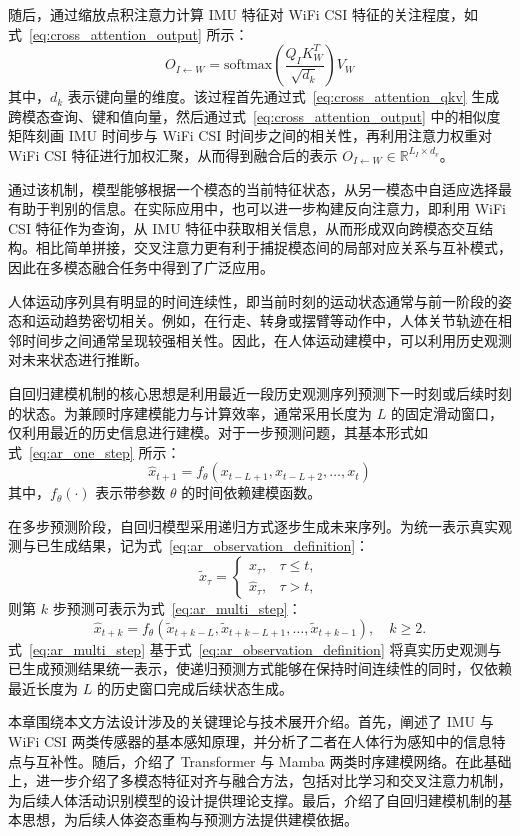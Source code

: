 随后，通过缩放点积注意力计算 IMU 特征对 WiFi CSI 特征的关注程度，如式~\eqref{eq:cross_attention_output} 所示：
\begin{equation}
O_{I \leftarrow W} =
\text{softmax}
\left(
\frac{Q_I K_W^T}{\sqrt{d_k}}
\right)
V_W
\label{eq:cross_attention_output}
\end{equation}
其中，$d_k$ 表示键向量的维度。该过程首先通过式~\eqref{eq:cross_attention_qkv} 生成跨模态查询、键和值向量，然后通过式~\eqref{eq:cross_attention_output} 中的相似度矩阵刻画 IMU 时间步与 WiFi CSI 时间步之间的相关性，再利用注意力权重对 WiFi CSI 特征进行加权汇聚，从而得到融合后的表示 $O_{I \leftarrow W} \in \mathbb{R}^{L_I \times d_v}$。

通过该机制，模型能够根据一个模态的当前特征状态，从另一模态中自适应选择最有助于判别的信息。在实际应用中，也可以进一步构建反向注意力，即利用 WiFi CSI 特征作为查询，从 IMU 特征中获取相关信息，从而形成双向跨模态交互结构。相比简单拼接，交叉注意力更有利于捕捉模态间的局部对应关系与互补模式，因此在多模态融合任务中得到了广泛应用\cite{oh2024multi,yin2023fineGrainedFusion}。


人体运动序列具有明显的时间连续性，即当前时刻的运动状态通常与前一阶段的姿态和运动趋势密切相关。例如，在行走、转身或摆臂等动作中，人体关节轨迹在相邻时间步之间通常呈现较强相关性。因此，在人体运动建模中，可以利用历史观测对未来状态进行推断。

自回归建模机制的核心思想是利用最近一段历史观测序列预测下一时刻或后续时刻的状态。为兼顾时序建模能力与计算效率，通常采用长度为 $L$ 的固定滑动窗口，仅利用最近的历史信息进行建模。对于一步预测问题，其基本形式如式~\eqref{eq:ar_one_step} 所示：
\begin{equation}
\hat{x}_{t+1} = f_\theta(x_{t-L+1}, x_{t-L+2}, \ldots, x_t)
\label{eq:ar_one_step}
\end{equation}
其中，$f_\theta(\cdot)$ 表示带参数 $\theta$ 的时间依赖建模函数。

在多步预测阶段，自回归模型采用递归方式逐步生成未来序列。为统一表示真实观测与已生成结果，记为式~\eqref{eq:ar_observation_definition}：
\begin{equation}
\tilde{x}_{\tau} =
\begin{cases}
x_{\tau}, & \tau \le t, \\
\hat{x}_{\tau}, & \tau > t,
\end{cases}
\label{eq:ar_observation_definition}
\end{equation}
则第 $k$ 步预测可表示为式~\eqref{eq:ar_multi_step}：
\begin{equation}
\hat{x}_{t+k} = f_\theta(\tilde{x}_{t+k-L}, \tilde{x}_{t+k-L+1}, \ldots, \tilde{x}_{t+k-1}), \quad k \ge 2.
\label{eq:ar_multi_step}
\end{equation}
式~\eqref{eq:ar_multi_step} 基于式~\eqref{eq:ar_observation_definition} 将真实历史观测与已生成预测结果统一表示，使递归预测方式能够在保持时间连续性的同时，仅依赖最近长度为 $L$ 的历史窗口完成后续状态生成。


本章围绕本文方法设计涉及的关键理论与技术展开介绍。首先，阐述了 IMU 与 WiFi CSI 两类传感器的基本感知原理，并分析了二者在人体行为感知中的信息特点与互补性。随后，介绍了 Transformer 与 Mamba 两类时序建模网络。在此基础上，进一步介绍了多模态特征对齐与融合方法，包括对比学习和交叉注意力机制，为后续人体活动识别模型的设计提供理论支撑。最后，介绍了自回归建模机制的基本思想，为后续人体姿态重构与预测方法提供建模依据。